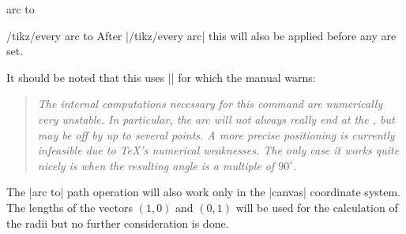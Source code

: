 \begin{pathoperation}{arc to}{}
\begin{stylekey}{/tikz/every arc to}
  After |/tikz/every arc| this will also be applied before any  are set.
\end{stylekey}

It should be noted that this uses |\pgfpatharcto| for which the \tikzname\space manual warns:\indexCommandO\pgfpatharcto
\begin{quote}\itshape
    The internal computations necessary for this command are numerically very unstable.
    In particular, the arc will not always really end at the ,
    but may be off by up to several points.
    A more precise positioning is currently infeasible due to \TeX's numerical weaknesses.
    The only case it works quite nicely is when the resulting angle is a multiple of $90^\circ$. 
\end{quote}

The |arc to| path operation will also work only in the |canvas| coordinate system.
The lengths of the vectors $(1, 0)$ and $(0, 1)$ will be used for the calculation of the radii
but no further consideration is done.
\end{pathoperation}